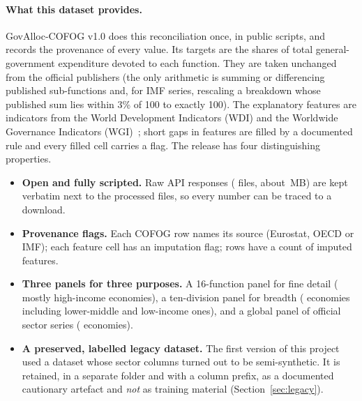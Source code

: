 \documentclass[11pt,a4paper]{article}
\DeclareRobustCommand*{\_}{\textunderscore\hskip0pt\relax}
\begin{document}
\paragraph{What this dataset provides.} GovAlloc-COFOG v1.0 does this reconciliation once, in public scripts, and records the provenance of every value. Its targets are the shares of total general-government expenditure devoted to each function. They are taken unchanged from the official publishers (the only arithmetic is summing or differencing published sub-functions and, for IMF series, rescaling a breakdown whose published sum lies within 3\% of 100 to exactly 100). The explanatory features are \DNumFeat{} indicators from the World Development Indicators (WDI) and the Worldwide Governance Indicators (WGI)~\cite{wdi,kaufmann2011}; short gaps in features are filled by a documented rule and every filled cell carries a flag. The release has four distinguishing properties.
\begin{itemize}[leftmargin=1.4em,itemsep=1pt,parsep=0pt]
\item \textbf{Open and fully scripted.} Raw API responses (\DRawFiles{} files, about \DRawMB\,MB) are kept verbatim next to the processed files, so every number can be traced to a download.
\item \textbf{Provenance flags.} Each COFOG row names its source (Eurostat, OECD or IMF); each feature cell has an imputation flag; rows have a count of imputed features.
\item \textbf{Three panels for three purposes.} A 16-function panel for fine detail (\DEconSix{} mostly high-income economies), a ten-division panel for breadth (\DEconTen{} economies including \DTenLowMid{} lower-middle and low-income ones), and a global panel of official sector series (\DEconWdi{} economies).
\item \textbf{A preserved, labelled legacy dataset.} The first version of this project used a dataset whose sector columns turned out to be semi-synthetic. It is retained, in a separate folder and with a column prefix, as a documented cautionary artefact and \emph{not} as training material (Section~\ref{sec:legacy}).
\end{itemize}
\end{document}
